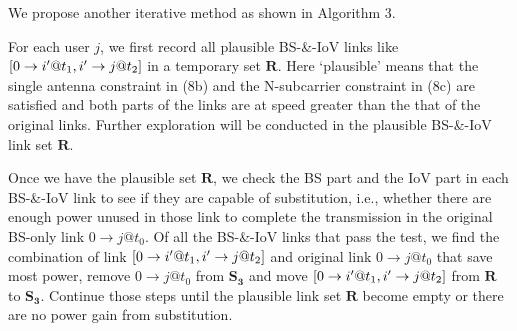 \documentclass{ieeeaccess}
\begin{document}
We propose another iterative method as shown in Algorithm 3. 


For each user $j$, we first record all plausible BS-\&-IoV links like $\left[ {{\rm{0}} \to i'@{t_1},i' \to j@{t_2}} \right]$ in a temporary set $\mathbf{R}$. Here `plausible' means that the single antenna constraint in (8b) and the N-subcarrier constraint in (8c) are satisfied and both parts of the links are at speed greater than the that of the original links. Further exploration will be conducted in the plausible BS-\&-IoV link set $\mathbf{R}$.

Once we have the plausible set $\mathbf{R}$, we check the BS part and the IoV part in each BS-\&-IoV link to see if they are capable of substitution, i.e., whether there are enough power unused in those link to complete the transmission in the original BS-only link $0 \to j @{t_0}$. Of all the BS-\&-IoV links that pass the test, we find the combination of link $\left[ {{\rm{0}} \to i'@{t_1},i' \to j@{t_2}} \right]$ and original link $0 \to j @{t_0}$ that save most power, remove $0 \to j @{t_0}$ from ${{\mathbf{S}}_{\mathbf{3}}}$ and move $\left[ {{\rm{0}} \to i'@{t_1},i' \to j@{t_2}} \right]$ from $\mathbf{R}$ to ${{\mathbf{S}}_{\mathbf{3}}}$. Continue those steps until the plausible link set $\mathbf{R}$ become empty or there are no power gain from substitution.
\end{document}
